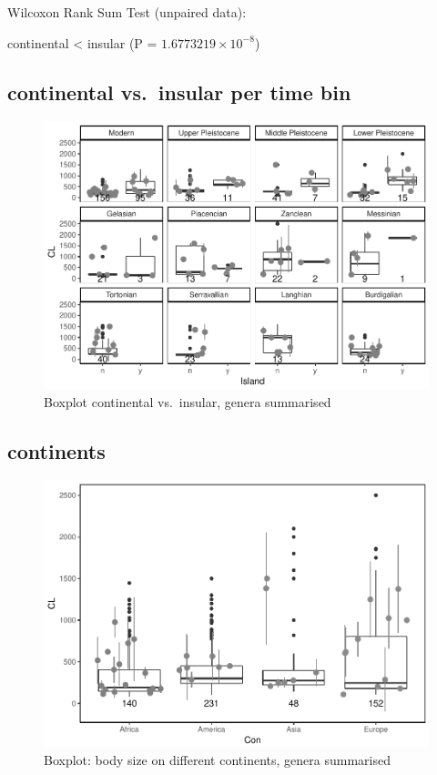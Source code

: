 \documentclass[]{article}
\begin{document}
Wilcoxon Rank Sum Test (unpaired data):

continental \textless{} insular (P = \(1.6773219\times 10^{-8}\))

\newpage

\subsection{continental vs.~insular per time
bin}\label{continental-vs.insular-per-time-bin-1}

\begin{figure}[htbp]
\centering
\includegraphics{MA_JJ_files/figure-latex/Boxplot continental vs. insular, split into time bins-1.pdf}
\caption{Boxplot continental vs.~insular, genera summarised}
\end{figure}

\newpage

\subsection{continents}\label{continents-1}

\begin{figure}[htbp]
\centering
\includegraphics{MA_JJ_files/figure-latex/Boxplot body size split into continents-1.pdf}
\caption{Boxplot: body size on different continents, genera summarised}
\end{figure}
\end{document}
